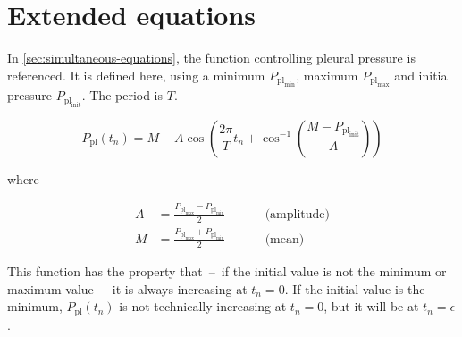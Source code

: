 %

\section{Extended equations} \label{appendix:equations}

\def\plmin{P_{\text{pl}_{\text{min}}}}
\def\plmax{P_{\text{pl}_{\text{max}}}}
\def\plinit{P_{\text{pl}_{\text{init}}}}

In \autoref{sec:simultaneous-equations}, the function controlling pleural pressure is referenced. It
is defined here, using a minimum $\plmin$, maximum $\plmax$ and initial pressure $\plinit$. The
period is $T$.

\begin{equation}
    P_{\text{pl}}(t_n) = M - A \cos\left(\frac{2\pi}{T} t_n + \cos^{-1}\left( \frac{M - \plinit}{A} \right)\right)
\end{equation}

\noindent where

\begin{align*}
    A &= \frac{\plmax - \plmin}{2}\hspace{1cm}&\text{(amplitude)} \\
    M &= \frac{\plmax + \plmin}{2}\hspace{1cm}&\text{(mean)}
\end{align*}

\noindent This function has the property that~--~if the initial value is not the minimum or maximum
value~--~it is always increasing at $t_n = 0$. If the initial value is the minimum,
$P_{\text{pl}}(t_n)$ is not technically increasing at $t_n = 0$, but it will be at $t_n = \epsilon$.
